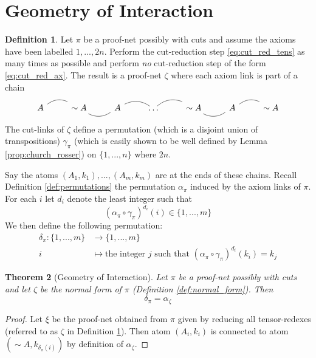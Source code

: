 \documentclass[12pt]{article}
\theoremstyle{plain}
\newtheorem{thm}{Theorem}[subsection] %
\theoremstyle{definition}
\newtheorem{defn}[thm]{Definition} %
\newcommand{\lto}{\longrightarrow}
\newcommand{\negation}{\sim}
\begin{document}
\section{Geometry of Interaction}
\begin{defn}\label{def:GoI_permutation}
Let $\pi$ be a proof-net possibly with cuts and assume the axioms have been labelled $1,...,2n$. Perform the cut-reduction step \eqref{eq:cut_red_tens} as many times as possible and perform \emph{no} cut-reduction step of the form \eqref{eq:cut_red_ax}. The result is a proof-net $\zeta$ where each axiom link is part of a chain
\begin{equation}
    \begin{tikzcd}
    A\arrow[r,dash,bend left] & \negation A\arrow[r,dash, bend right] & A\arrow[r,dash,bend left] & \hdots\arrow[r,dash,bend left] & \negation A\arrow[r,dash,bend right] & A\arrow[r,dash,bend left] & \negation A
    \end{tikzcd}
\end{equation}
The cut-links of $\zeta$ define a permutation (which is a disjoint union of transpositions) $\gamma_{\pi}$ (which is easily shown to be well defined by Lemma \ref{prop:church_rosser}) on $\lbrace 1,...,n\rbrace$ where $2n$.

Say the atoms $(A_{1},k_1),...,(A_m,k_m)$ are at the ends of these chains. Recall Definition \ref{def:permutations} the permutation $\alpha_{\pi}$ induced by the axiom links of $\pi$. For each $i$ let $d_i$ denote the least integer such that 
\begin{equation}
(\alpha_{\pi} \circ \gamma_{\pi})^{d_i}(i) \in \lbrace 1,...,m\rbrace    
\end{equation}
We then define the following permutation:
\begin{align*}
    \delta_{\pi}: \lbrace 1,...,m\rbrace &\lto \lbrace 1,...,m\rbrace\\
    i &\longmapsto \text{the integer }j\text{ such that } (\alpha_{\pi} \circ \gamma_{\pi})^{d_i}(k_i) = k_j
\end{align*}
\end{defn}
\begin{thm}[Geometry of Interaction]
Let $\pi$ be a proof-net possibly with cuts and let $\zeta$ be the normal form of $\pi$ (Definition \ref{def:normal_form}). Then
\begin{equation}
    \delta_\pi = \alpha_{\zeta}
\end{equation}
\end{thm}
\begin{proof}
Let $\xi$ be the proof-net obtained from $\pi$ given by reducing all tensor-redexes (referred to as $\zeta$ in Definition \ref{def:GoI_permutation}). Then atom $(A_i,k_i)$ is connected to atom $(\negation A, k_{\delta_{\pi}(i)})$ by definition of $\alpha_{\zeta}$.
\end{proof}
\end{document}

